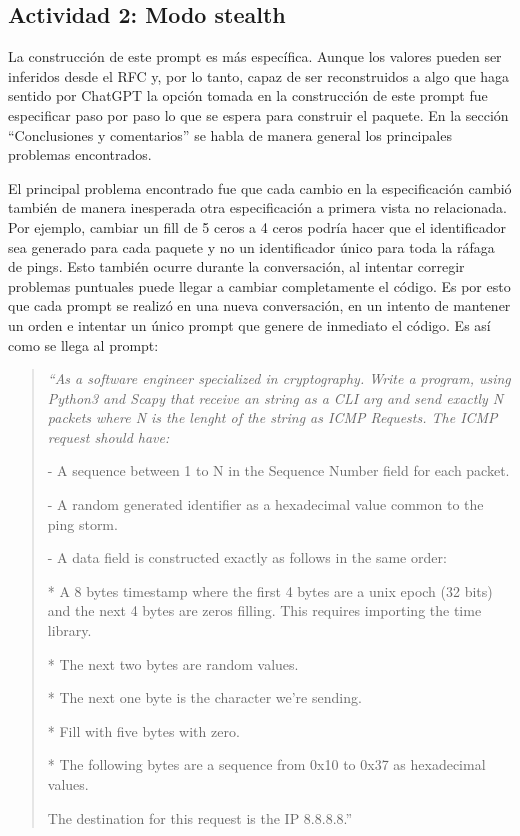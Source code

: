 \documentclass[letter,12pt]{article}
\newenvironment{itquote}
  {\begin{quote}\itshape}
  {\end{quote}\ignorespacesafterend}
\begin{document}
\subsection{Actividad 2: Modo stealth}
La construcción de este prompt es más específica. Aunque los valores pueden ser inferidos desde el RFC y, por lo tanto, capaz de ser reconstruidos a algo que haga sentido por ChatGPT la opción tomada en la construcción de este prompt fue especificar paso por paso lo que se espera para construir el paquete. En la sección ``Conclusiones y comentarios'' se habla de manera general los principales problemas encontrados.

El principal problema encontrado fue que cada cambio en la especificación cambió también de manera inesperada otra especificación a primera vista no relacionada. Por ejemplo, cambiar un fill de 5 ceros a 4 ceros podría hacer que el identificador sea generado para cada paquete y no un identificador único para toda la ráfaga de pings. Esto también ocurre durante la conversación, al intentar corregir problemas puntuales puede llegar a cambiar completamente el código. Es por esto que cada prompt se realizó en una nueva conversación, en un intento de mantener un orden e intentar un único prompt que genere de inmediato el código. Es así como se llega al prompt:

\begin{itquote}
  ``As a software engineer specialized in cryptography. Write a program, using Python3 and Scapy that receive an string as a CLI arg and send exactly N packets where N is the lenght of the string as ICMP Requests. The ICMP request should have:

- A sequence between 1 to N in the Sequence Number field for each packet.

- A random generated identifier as a hexadecimal value common to the ping storm.

- A data field is constructed exactly as follows in the same order:

 * A 8 bytes timestamp where the first 4 bytes are a unix epoch (32 bits) and the next 4 bytes are zeros filling. This requires importing the time library.

 * The next two bytes are random values.

 * The next one byte is the character we're sending.

 * Fill with five bytes with zero.

 * The following bytes are a sequence from 0x10 to 0x37 as hexadecimal values.

The destination for this request is the IP 8.8.8.8.''
\end{itquote}
\end{document}
